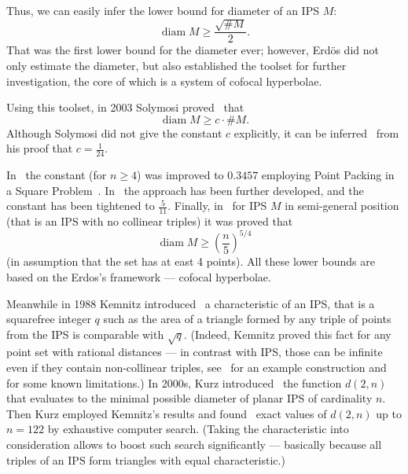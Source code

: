 \documentclass[a4paper,14pt]{article} %
\theoremstyle{plain}
\theoremstyle{definition}
\DeclareMathOperator{\diam}{diam}
\begin{document}
	Thus, we can easily infer the lower bound for diameter of an IPS $M$:
	$$
		\operatorname{diam} M \ge \frac{\sqrt{\#M}}{2}.
	$$
	That was the first lower bound for the diameter ever;
	however, Erdös did not only estimate the diameter,
	but also established the toolset for further investigation, the core of which is a system of cofocal hyperbolae.

	Using this toolset, in 2003 Solymosi proved~\cite{solymosi2003note} that
	$$
		\operatorname{diam} M \ge c \cdot \#M.
	$$
	Although Solymosi did not give the constant $c$ explicitly,
	it can be inferred~\cite{our-vmmsh-2018-translit} from his proof that $c=\frac{1}{24}$.

	In~\cite{our-vmmsh-2018-translit} the constant (for $n\geq 4$) was improved to $0.3457$
	employing Point Packing in a Square Problem~\cite{markot2005newverified,costa2013valid}.
	In~\cite{my-pps-linear-bound-2019} the approach has been further developed, and the constant has been tightened to $\frac{5}{11}$.
	Finally, in~\cite{my-semi-general-5-4-bound-2019} for IPS $M$ in semi-general position (that is an IPS with no collinear triples) it was proved that
	\begin{equation}
		\label{eq:chebsb_lower_bound}
		\diam M \geq \left(\frac n 5 \right)^{5/4}
	\end{equation}
	(in assumption that the set has at east 4 points).
	All these lower bounds are based on the Erdos's framework --- cofocal hyperbolae.


	Meanwhile in 1988 Kemnitz introduced~\cite{kemnitz1988punktmengen}
	a characteristic of an IPS, that is a squarefree integer $q$ such as the area
	of a triangle formed by any triple of points from the IPS is comparable with $\sqrt{q}$.
	(Indeed, Kemnitz proved this fact for any point set with rational distances ---
	in contrast with IPS, those can be infinite even if they contain non-collinear triples,
	see~\cite{huff1948diophantine} for an example construction
	and~\cite{solymosi2010question} for some known limitations.)
	In 2000s, Kurz introduced~\cite{kurz2005characteristic} the function $d(2,n)$ that evaluates
	to the minimal possible diameter of planar IPS of cardinality $n$.
	Then Kurz employed Kemnitz's results and found~\cite[Subsection 4.2]{kurz2008minimum} exact values of $d(2,n)$
	up to $n=122$ by exhaustive computer search.
	(Taking the characteristic into consideration allows to boost such search significantly ---
	basically because all triples of an IPS form triangles with equal characteristic.)
\end{document}
